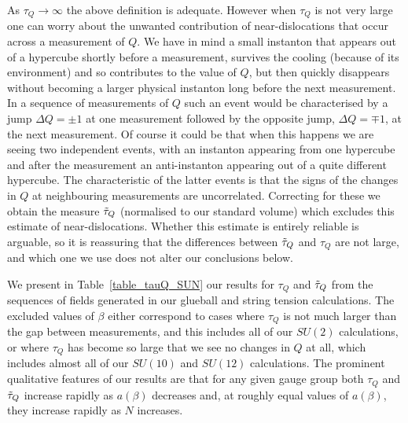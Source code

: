 \documentclass[12pt]{article}
\begin{document}
As $\tau_Q \to \infty$ the above definition is adequate. However when $\tau_Q$ is not very large
one can worry about the unwanted contribution of near-dislocations that occur across
a measurement of $Q$. We have in mind 
a small instanton that appears out of a hypercube shortly before a measurement, survives the
cooling (because of its environment)  and so contributes to the value of $Q$, but then quickly
disappears without becoming a larger physical instanton long before the next measurement.
In a sequence of measurements of $Q$ such an event would be characterised by a jump  $\Delta Q = \pm 1$
at one measurement followed by  the opposite jump,  $\Delta Q = \mp 1$, at the next measurement.
Of course it could be that when this happens we are seeing two independent events, with an
instanton appearing from one hypercube and after the measurement an anti-instanton appearing
out of a quite different hypercube. The characteristic of the latter events is that the signs of
the changes in $Q$ at neighbouring measurements are uncorrelated. Correcting for these we obtain
the measure  $\Tilde{\tau}_Q$ (normalised to our standard volume) which excludes this
estimate of near-dislocations. Whether this estimate is entirely reliable is arguable, so it is
reassuring that the differences between $\Tilde{\tau}_Q$ and $\tau_Q$ are not large,
and which one we use does not alter our conclusions below.

We present in Table~\ref{table_tauQ_SUN} our results for $\tau_Q$  and  $\Tilde{\tau}_Q$
from the sequences of fields generated in our glueball and string tension calculations.
The excluded values of $\beta$ either correspond to cases where $\tau_Q$ is not much
larger than the gap between measurements, and this includes all of our $SU(2)$ calculations,
or where $\tau_Q$ has become so large that we see no changes in $Q$ at all, which includes
almost all of our $SU(10)$ and $SU(12)$ calculations. The prominent qualitative features of our
results are that for any given gauge group both  $\tau_Q$  and  $\Tilde{\tau}_Q$ increase rapidly
as $a(\beta)$ decreases and, at roughly equal values of $a(\beta)$, they increase rapidly
as $N$ increases.
\end{document}
